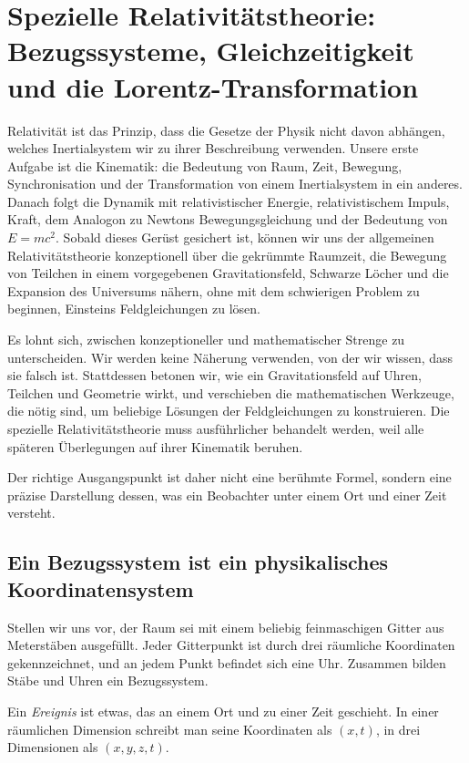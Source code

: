 \chapter{Spezielle Relativitätstheorie: Bezugssysteme, Gleichzeitigkeit und die Lorentz-Transformation}

Relativität ist das Prinzip, dass die Gesetze der Physik nicht davon abhängen, welches Inertialsystem wir zu ihrer Beschreibung verwenden. Unsere erste Aufgabe ist die Kinematik: die Bedeutung von Raum, Zeit, Bewegung, Synchronisation und der Transformation von einem Inertialsystem in ein anderes. Danach folgt die Dynamik mit relativistischer Energie, relativistischem Impuls, Kraft, dem Analogon zu Newtons Bewegungsgleichung und der Bedeutung von \(E=mc^2\). Sobald dieses Gerüst gesichert ist, können wir uns der allgemeinen Relativitätstheorie konzeptionell über die gekrümmte Raumzeit, die Bewegung von Teilchen in einem vorgegebenen Gravitationsfeld, Schwarze Löcher und die Expansion des Universums nähern, ohne mit dem schwierigen Problem zu beginnen, Einsteins Feldgleichungen zu lösen.

Es lohnt sich, zwischen konzeptioneller und mathematischer Strenge zu unterscheiden. Wir werden keine Näherung verwenden, von der wir wissen, dass sie falsch ist. Stattdessen betonen wir, wie ein Gravitationsfeld auf Uhren, Teilchen und Geometrie wirkt, und verschieben die mathematischen Werkzeuge, die nötig sind, um beliebige Lösungen der Feldgleichungen zu konstruieren. Die spezielle Relativitätstheorie muss ausführlicher behandelt werden, weil alle späteren Überlegungen auf ihrer Kinematik beruhen.

Der richtige Ausgangspunkt ist daher nicht eine berühmte Formel, sondern eine präzise Darstellung dessen, was ein Beobachter unter einem Ort und einer Zeit versteht.

\section{Ein Bezugssystem ist ein physikalisches Koordinatensystem}

Stellen wir uns vor, der Raum sei mit einem beliebig feinmaschigen Gitter aus Meterstäben ausgefüllt. Jeder Gitterpunkt ist durch drei räumliche Koordinaten gekennzeichnet, und an jedem Punkt befindet sich eine Uhr. Zusammen bilden Stäbe und Uhren ein Bezugssystem.

\begin{definition}Ein \emph{Ereignis} ist etwas, das an einem Ort und zu einer Zeit geschieht. In einer räumlichen Dimension schreibt man seine Koordinaten als \((x,t)\), in drei Dimensionen als \((x,y,z,t)\).
\end{definition}

